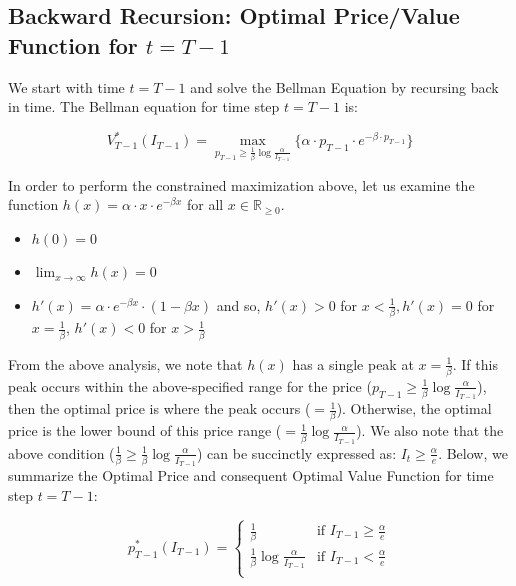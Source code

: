 \documentclass[12pt]{amsart}
\begin{document}
   \subsection{Backward Recursion: Optimal Price/Value Function for $t = T-1$} 
   We start with time $t = T-1$ and solve the Bellman Equation by recursing back in time. The Bellman equation for time step $t = T-1$ is:
      
   $$V_{T-1}^*(I_{T-1}) = \max_{p_{T-1} \geq \frac 1 \beta \log \frac \alpha {I_{T-1}}} \{ \alpha \cdot p_{T-1} \cdot  e^{-\beta \cdot p_{T-1}} \}$$
   
   In order to perform the constrained maximization above, let us examine the function $h(x) = \alpha \cdot x \cdot e^{-\beta x}$ for all $x \in \mathbb{R}_{\geq 0}$.
   \begin{itemize}
   \item $h(0) = 0$
   \item $\lim_{x \to \infty} h(x) = 0$
   \item $h'(x) = \alpha \cdot e^{-\beta x} \cdot (1 - \beta x)$ and so, $h'(x) > 0$ for $x < \frac 1 \beta, h'(x) = 0$ for $x = \frac 1 \beta$, $h'(x) < 0$ for $x > \frac 1 \beta$
   \end{itemize}

From the above analysis, we note that $h(x)$ has a single peak at $x = \frac 1 \beta$. If this peak occurs within the above-specified range for the price ($p_{T-1} \geq \frac 1 \beta \log \frac \alpha {I_{T-1}}$), then the optimal price is where the peak occurs ($= \frac 1 \beta$). Otherwise, the optimal price is the lower bound of this price range ($= \frac 1 \beta \log \frac \alpha {I_{T-1}}$). We also note that the above condition ($\frac 1 \beta \geq \frac 1 \beta \log \frac \alpha {I_{T-1}}$) can be succinctly expressed as: $I_t \geq \frac \alpha e$. Below, we summarize the Optimal Price and consequent Optimal Value Function for time step $t = T-1$:

$$
p_{T-1}^*(I_{T-1}) = 
\begin{cases}
\frac 1 \beta & \text{if } I_{T-1} \geq \frac \alpha e \\
\frac 1 \beta \log{ \frac \alpha {I_{T-1}}} & \text{if } I_{T-1} < \frac \alpha e\\
\end{cases}
$$
\end{document}
